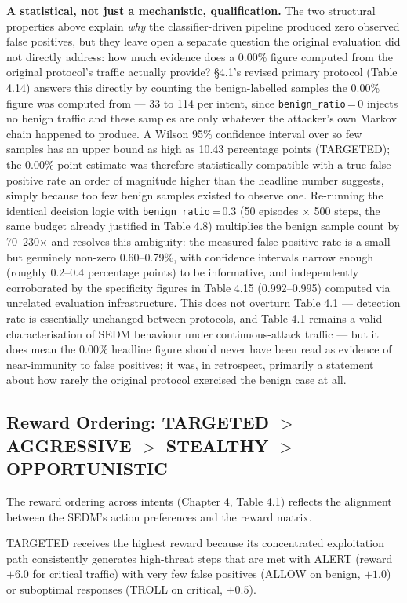 \textbf{A statistical, not just a mechanistic, qualification.}
The two structural properties above explain \emph{why} the classifier-driven
pipeline produced zero observed false positives, but they leave open a
separate question the original evaluation did not directly address: how
much evidence does a 0.00\% figure computed from the original protocol's
traffic actually provide?
\S4.1's revised primary protocol (Table 4.14) answers this directly by
counting the benign-labelled samples the 0.00\% figure was computed from
--- 33 to 114 per intent, since \texttt{benign\_ratio}\,=\,0 injects no
benign traffic and these samples are only whatever the attacker's own
Markov chain happened to produce.
A Wilson 95\% confidence interval over so few samples has an upper bound as
high as 10.43 percentage points (TARGETED); the 0.00\% point estimate was
therefore statistically compatible with a true false-positive rate an order
of magnitude higher than the headline number suggests, simply because too
few benign samples existed to observe one.
Re-running the identical decision logic with \texttt{benign\_ratio}\,=\,0.3
(50 episodes $\times$ 500 steps, the same budget already justified in
Table 4.8) multiplies the benign sample count by 70--230$\times$ and
resolves this ambiguity: the measured false-positive rate is a small but
genuinely non-zero 0.60--0.79\%, with confidence intervals narrow enough
(roughly 0.2--0.4 percentage points) to be informative, and independently
corroborated by the specificity figures in Table 4.15 (0.992--0.995)
computed via unrelated evaluation infrastructure.
This does not overturn Table 4.1 --- detection rate is essentially
unchanged between protocols, and Table 4.1 remains a valid characterisation
of SEDM behaviour under continuous-attack traffic --- but it does mean the
0.00\% headline figure should never have been read as evidence of
near-immunity to false positives; it was, in retrospect, primarily a
statement about how rarely the original protocol exercised the benign case
at all.

\subsection{Reward Ordering: TARGETED $>$ AGGRESSIVE $>$ STEALTHY $>$ OPPORTUNISTIC}

The reward ordering across intents (Chapter 4, Table 4.1) reflects the
alignment between the SEDM's action preferences and the reward matrix.

TARGETED receives the highest reward because its concentrated exploitation
path consistently generates high-threat steps that are met with ALERT
(reward $+6.0$ for critical traffic) with very few false positives (ALLOW
on benign, $+1.0$) or suboptimal responses (TROLL on critical, $+0.5$).

